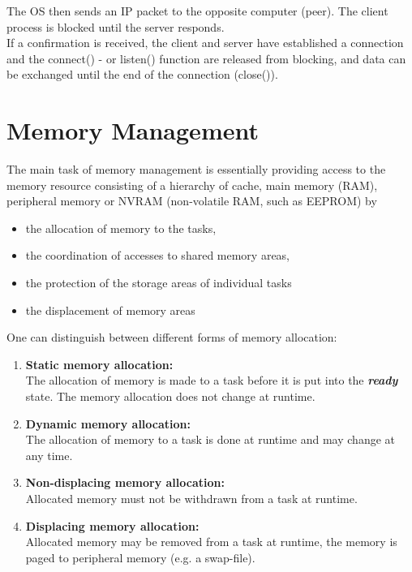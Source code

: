 The OS then sends an IP packet to the opposite computer (peer). The client process is blocked until the server responds.\\

If a confirmation is received, the client and server have established a connection and the connect() - or listen() function are released from blocking, and data can be exchanged until the end of the connection (close()).
\newpage

\section{Memory Management}

The main task of memory management is essentially providing access to the memory resource consisting of a hierarchy of cache, main memory (RAM), peripheral memory or NVRAM (non-volatile RAM, such as EEPROM) by

\begin{itemize}
	\item  the allocation of memory to the tasks,
	\item  the coordination of accesses to shared memory areas,
	\item  the protection of the storage areas of individual tasks
	\item  the displacement of memory areas
\end{itemize}

One can distinguish between different forms of memory allocation:

\begin{enumerate}
\item  \textbf{Static memory allocation: \\}The allocation of memory is made to a task before it is put into the \textbf{\textit{ready}} state. The memory allocation does not change at runtime.

\item  \textbf{Dynamic memory allocation: }\\The allocation of memory to a task is done at runtime and may change at any time.

\item  \textbf{Non-displacing memory allocation: }\\Allocated memory must not be withdrawn from a task at runtime.

\item  \textbf{Displacing memory allocation: }\\Allocated memory may be removed from a task at runtime, the memory is paged to peripheral memory (e.g. a swap-file).
\end{enumerate}

